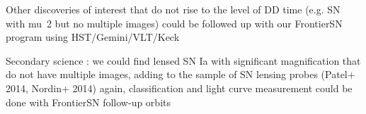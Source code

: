 Other discoveries of interest that do not rise to the level of DD time (e.g. SN with mu~2 but no multiple images) could be followed up with our FrontierSN program using HST/Gemini/VLT/Keck




Secondary science : 
    we could find lensed SN Ia with significant magnification that do not have multiple images, adding to the sample of SN lensing probes (Patel+ 2014, Nordin+ 2014)
      again, classification and light curve measurement could be done with FrontierSN follow-up orbits











